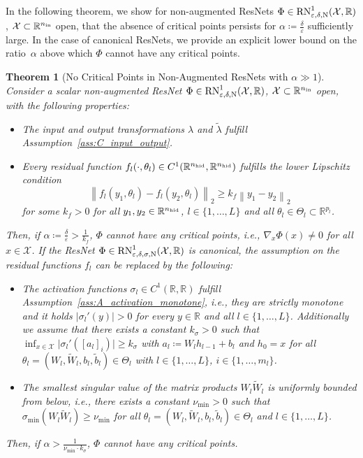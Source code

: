 \documentclass[10pt]{article}
\newtheorem{theorem}{Theorem}[section]
\theoremstyle{definition}
\numberwithin{equation}{section}
\newcommand{\eps}{\varepsilon}
\newcommand\norm[1]{\left\lVert#1\right\rVert}
\newcommand\abs[1]{\left\lvert#1\right\rvert}
\newcommand{\R}{\mathbb{R}}
\newcommand*{\nhid}{n_\textup{hid}}
\newcommand*{\nin}{n_\textup{in}}
\begin{document}
In the following theorem, we show for non-augmented ResNets $\Phi \in \textup{RN}^1_{\eps,\delta,\textup{N}}(\mathcal{X},\R)$, $\mathcal{X}\subset \R^{\nin}$ open, that the absence of critical points persists for $\alpha \coloneqq \frac{\delta}{\eps}$ sufficiently large. In the case of canonical ResNets, we provide an explicit lower bound on the ratio~$\alpha$ above which $\Phi$ cannot have any critical points. 

\begin{theorem}[No Critical Points in Non-Augmented ResNets with $\alpha \gg 1$] \label{th:resnet_criticalpoints_alphalarge}
	Consider a scalar non-augmented ResNet $\Phi \in \textup{RN}^1_{\eps,\delta,\textup{N}}(\mathcal{X},\R)$, $\mathcal{X}\subset \R^{\nin}$ open, with the following properties:
	\begin{itemize}
		\item The input and output transformations $\lambda$ and $\tilde{\lambda}$ fulfill Assumption~\ref{ass:C_input_output}.
		\item Every residual function $f_l(\cdot,\theta_l)\in C^1(\R^{\nhid},\R^{\nhid})$ fulfills the lower Lipschitz condition
		\begin{equation*}
			\norm{f_l(y_1,\theta_l)-f_l(y_2,\theta_l)}_2\geq k_f \norm{y_1-y_2}_2
		\end{equation*}
		for some $k_f >0$ for all $y_1,y_2 \in\R^{\nhid}$, $l \in \{1,\ldots,L\}$ and all $\theta_l \in \Theta_l \subset \R^{p_l}$.
	\end{itemize}
	Then, if $\alpha \coloneqq \frac{\delta}{\eps} > \frac{1}{k_{f} }$,  $\Phi$ cannot have any critical points, i.e., $\nabla_x \Phi(x) \neq 0$ for all $x \in \mathcal{X}$. If the ResNet $\Phi \in \textup{RN}^1_{\eps,\delta,\sigma,\textup{N}}(\mathcal{X},\R)$ is canonical, the assumption on the residual functions $f_l$ can be replaced by the following:
	\begin{itemize}
		\item The activation functions $\sigma_l\in C^1(\R,\R)$ fulfill Assumption~\ref{ass:A_activation_monotone}, i.e., they are strictly monotone and it holds $ \abs{\sigma_l'(y)} > 0$ for every $y \in \R$ and all $l \in \{1,\ldots,L\}$. Additionally we assume that there exists a constant $k_\sigma >0$ such that $\inf_{x \in \mathcal{X}} \vert \sigma_l'([a_l]_i)\vert \geq k_\sigma$ with $a_l \coloneqq W_l h_{l-1} + b_l$ and $h_0 = x$ for all $\theta_l = (W_l,\widetilde{W}_l,b_l,\tilde{b}_l)\in \Theta_l$ with $l \in \{1,\ldots,L\}$, $i\in\{1,\ldots,m_l\}$.
		\item The smallest singular value of the matrix products $W_l\widetilde{W}_{l}$ is uniformly bounded from below, i.e., there exists a constant $\nu_{\min}>0$ such that  $\sigma_{\min}(W_l\widetilde{W}_{l}) \geq \nu_{\min}$ for all $\theta_l = (W_l,\widetilde{W}_l,b_l,\tilde{b}_l)\in \Theta_l$ and $l \in \{1,\ldots,L\}$.
	\end{itemize}
	Then, if $\alpha > \frac{1}{\nu_{\min}\cdot k_\sigma}$, $\Phi$ cannot have any critical points.
\end{theorem}
\end{document}

